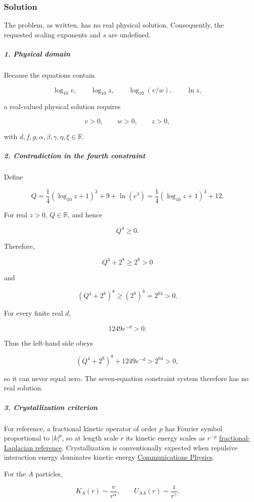 \subsubsection*{Solution}
The problem, as written, has no real physical solution. Consequently, the requested scaling exponents and $s$ are undefined.

\subparagraph*{1. Physical domain}

Because the equations contain

\[
\log_{10}v,\qquad \log_{10}z,\qquad \log_{10}(v/w),\qquad \ln z,
\]

a real-valued physical solution requires

\[
v>0,\qquad w>0,\qquad z>0,
\]

with $d,f,g,\alpha,\beta,\gamma,\eta,\xi\in\mathbb R$.

\subparagraph*{2. Contradiction in the fourth constraint}

Define

\[
Q=\frac14(\log_{10}z+1)^3+9+\ln(e^3) =\frac14(\log_{10}z+1)^3+12.
\]

For real $z>0$, $Q\in\mathbb R$, and hence

\[
Q^4\geq 0.
\]

Therefore,

\[
Q^4+2^8\geq 2^8>0
\]

and

\[
\left(Q^4+2^8\right)^8\geq (2^8)^8=2^{64}>0.
\]

For every finite real $d$,

\[
1249e^{-d}>0.
\]

Thus the left-hand side obeys

\[
\left(Q^4+2^8\right)^8+1249e^{-d} >2^{64}>0,
\]

so it can never equal zero. The seven-equation constraint system therefore has no real solution.

\subparagraph*{3. Crystallization criterion}

For reference, a fractional kinetic operator of order $p$ has Fourier symbol proportional to $\lvert k\rvert^p$, so at length scale $r$ its kinetic energy scales as $r^{-p}$ \href{\detokenize{https://arxiv.org/abs/2311.07814}}{fractional-Laplacian reference}. Crystallization is conventionally expected when repulsive interaction energy dominates kinetic energy \href{\detokenize{https://www.nature.com/articles/s42005-022-01095-8}}{Communications Physics}.

For the $A$ particles,

\[
K_A(r)\sim \frac{v}{r^\alpha}, \qquad U_{AA}(r)\sim \frac{z}{r^\gamma}.
\]

